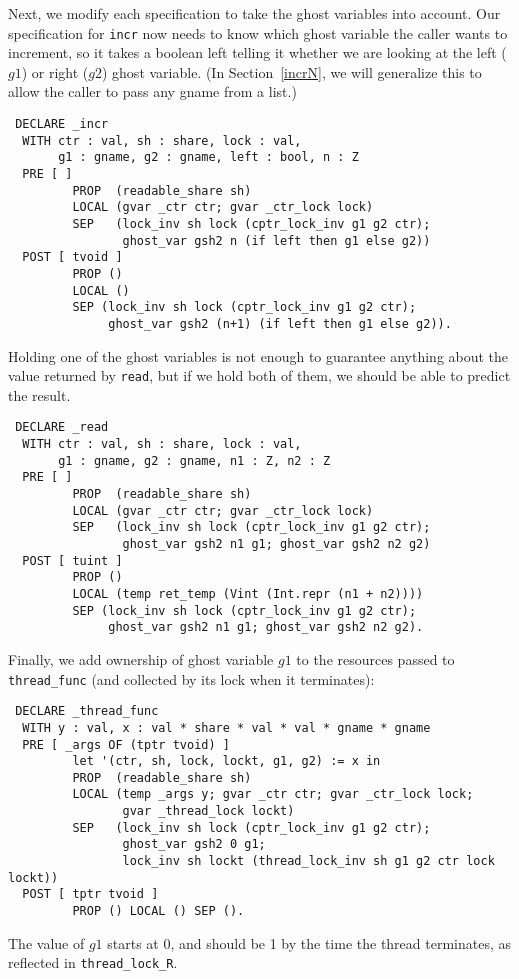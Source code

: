 \documentclass[11pt]{article} %
\begin{document}
Next, we modify each specification to take the ghost variables into account. Our specification for \texttt{incr} now needs to know which ghost variable the caller wants to increment, so it takes a boolean \textsf{left} telling it whether we are looking at the left ($g1$) or right ($g2$) ghost variable. (In Section~\ref{incrN}, we will generalize this to allow the caller to pass any \textsf{gname} from a list.)
\begin{verbatim}
 DECLARE _incr
  WITH ctr : val, sh : share, lock : val,
       g1 : gname, g2 : gname, left : bool, n : Z
  PRE [ ]
         PROP  (readable_share sh)
         LOCAL (gvar _ctr ctr; gvar _ctr_lock lock)
         SEP   (lock_inv sh lock (cptr_lock_inv g1 g2 ctr);
                ghost_var gsh2 n (if left then g1 else g2))
  POST [ tvoid ]
         PROP ()
         LOCAL ()
         SEP (lock_inv sh lock (cptr_lock_inv g1 g2 ctr);
              ghost_var gsh2 (n+1) (if left then g1 else g2)).
\end{verbatim}

Holding one of the ghost variables is not enough to guarantee anything about the value returned by \texttt{read}, but if we hold both of them, we should be able to predict the result.
\begin{verbatim}
 DECLARE _read
  WITH ctr : val, sh : share, lock : val,
       g1 : gname, g2 : gname, n1 : Z, n2 : Z
  PRE [ ]
         PROP  (readable_share sh)
         LOCAL (gvar _ctr ctr; gvar _ctr_lock lock)
         SEP   (lock_inv sh lock (cptr_lock_inv g1 g2 ctr);
                ghost_var gsh2 n1 g1; ghost_var gsh2 n2 g2)
  POST [ tuint ]
         PROP ()
         LOCAL (temp ret_temp (Vint (Int.repr (n1 + n2))))
         SEP (lock_inv sh lock (cptr_lock_inv g1 g2 ctr);
              ghost_var gsh2 n1 g1; ghost_var gsh2 n2 g2).
\end{verbatim}

Finally, we add ownership of ghost variable $g1$ to the resources passed to \texttt{thread\_func} (and collected by its lock when it terminates):
\begin{verbatim}
 DECLARE _thread_func
  WITH y : val, x : val * share * val * val * gname * gname
  PRE [ _args OF (tptr tvoid) ]
         let '(ctr, sh, lock, lockt, g1, g2) := x in
         PROP  (readable_share sh)
         LOCAL (temp _args y; gvar _ctr ctr; gvar _ctr_lock lock;
                gvar _thread_lock lockt)
         SEP   (lock_inv sh lock (cptr_lock_inv g1 g2 ctr);
                ghost_var gsh2 0 g1;
                lock_inv sh lockt (thread_lock_inv sh g1 g2 ctr lock lockt))
  POST [ tptr tvoid ]
         PROP () LOCAL () SEP ().
\end{verbatim}
The value of $g1$ starts at 0, and should be 1 by the time the thread terminates, as reflected in \texttt{thread\_lock\_R}.
\end{document}
